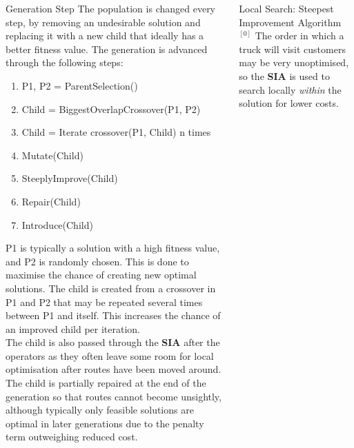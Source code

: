 \documentclass[ %
                    author={Callum Mann},
                     title={Genetic algorithm for the CVRP},
                  subtitle={Capacitated Vehicle Routing Problem},
                      type={Heuristic},
                      year={2016}]{poster}
\begin{document}
\begin{frame}{}
\begin{columns}[t]
\begin{column}{0.422\linewidth}
    \vfill

    \begin{block}{\Large Generation Step}
      The population is changed every step, by removing an undesirable solution and
      replacing it with a new child that ideally has a better fitness value. The generation
      is advanced through the following steps:
      \begin{enumerate}
        \item P1, P2 = ParentSelection()
        \item Child = BiggestOverlapCrossover(P1, P2)
        \item Child = Iterate crossover(P1, Child) n times
        \item Mutate(Child)
        \item SteeplyImprove(Child)
        \item Repair(Child)
        \item Introduce(Child)
      \end{enumerate}
      \vspace{1cm}

      P1 is typically a solution with a high fitness value, and P2 is randomly chosen.
      This is done to maximise the chance of creating new optimal solutions. The child
      is created from a crossover in P1 and P2 that may be repeated several times between
      P1 and itself. This increases the chance of an improved child per iteration.
      \vspace{1cm} \\
      The child is also passed through the \textbf{SIA} after the operators as
      they often leave some room for local optimisation after routes have been
      moved around. The child is partially repaired at the end of the generation
      so that routes cannot become unsightly,
      although typically only feasible solutions are optimal in later generations
      due to the penalty term outweighing reduced cost.

    \end{block}
    \vspace{1cm}

  \end{column}

  \begin{column}{0.450\linewidth}
    \begin{block}{\Large Local Search: Steepest Improvement Algorithm $^{[0]}$}
      The order in which a truck will visit customers may be very unoptimised, so the \textbf{SIA} is used
      to search locally \textit{within} the solution for lower costs.
    \end{block}
    \vspace{1cm}


\end{column}
\end{columns}
\end{frame}
\end{document}

